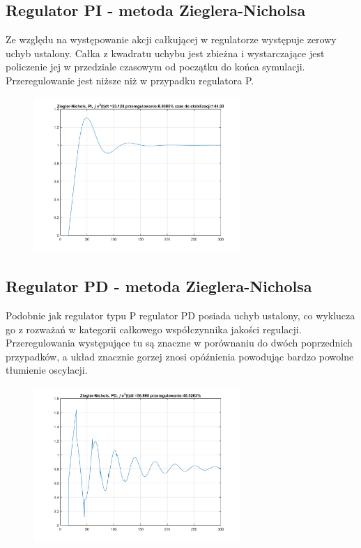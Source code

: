 \documentclass[a4paper, 12pt]{article}
\begin{document}
		\subsection{Regulator PI - metoda Zieglera-Nicholsa}
			Ze względu na występowanie akcji całkującej w regulatorze występuje zerowy uchyb ustalony. Całka z kwadratu uchybu jest zbieżna i wystarczające jest policzenie jej w przedziale czasowym od początku do końca symulacji. Przeregulowanie jest niższe niż w przypadku regulatora P.
			\begin{figure}[H]
				\centering
				\includegraphics[width = 0.7\textwidth]{./img/ZN_PI.png}
			\end{figure}
		\subsection{Regulator PD - metoda Zieglera-Nicholsa}
			Podobnie jak regulator typu P regulator PD posiada uchyb ustalony, co wyklucza go z rozważań w kategorii całkowego współczynnika jakości regulacji. Przeregulowania występujące tu są znaczne w porównaniu do dwóch poprzednich przypadków, a układ znacznie gorzej znosi opóźnienia powodując bardzo powolne tłumienie oscylacji.
			\begin{figure}[H]
				\centering
				\includegraphics[width = 0.7\textwidth]{./img/ZN_PD.png}
			\end{figure}
\end{document}

